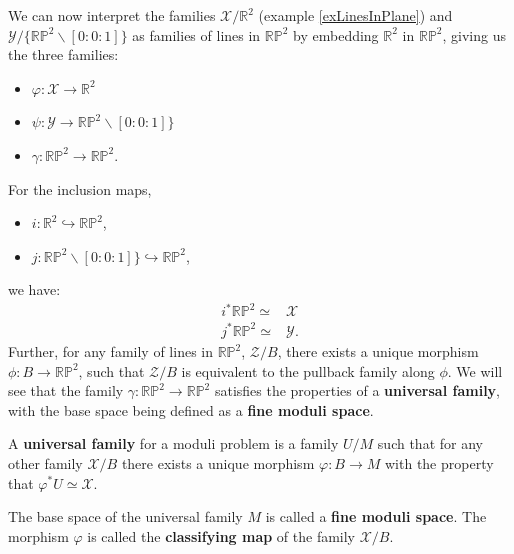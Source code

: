 \begin{example}
    \par We can now interpret the families $\mathcal{X}/\mathbb{R}^{2}$ (example \ref{exLinesInPlane}) and $\mathcal{Y}/\{\mathbb{RP}^{2}\backslash {[0:0:1]}\} $ as families of lines in $\mathbb{RP}^{2}$ by embedding $\mathbb{R}^{2}$ in $\mathbb{RP}^{2}$, giving us the three families:
    \begin{itemize}
        \item $\varphi : \mathcal{X} \to \mathbb{R}^{2}$
    \item $\psi: \mathcal{Y} \to \mathbb{RP}^{2}\backslash {[0:0:1]}\} $
    \item $\gamma: \mathbb{RP}^{2} \to \mathbb{RP}^{2}$.
\end{itemize}
For the inclusion maps, 
\begin{itemize}
    \item $i: \mathbb{R}^{2}\hookrightarrow \mathbb{RP}^{2}$,
\item $j: \mathbb{RP}^{2}\backslash {[0:0:1]}\} \hookrightarrow \mathbb{RP}^{2}$,
\end{itemize}
we have: 
\begin{align*}
    i^{*}\mathbb{RP}^{2} \simeq &\mathcal{X}\\
    j^{*}\mathbb{RP}^{2} \simeq &\mathcal{Y}.
\end{align*}
Further, for any family of lines in $\mathbb{RP}^{2}$, $\mathcal{Z}/B$, there exists a unique morphism $\phi :B \to \mathbb{RP}^{2}$, such that $\mathcal{Z}/B$ is equivalent to the pullback family along $\phi$.
We will see that the family $\gamma: \mathbb{RP}^{2} \to \mathbb{RP}^{2}$ satisfies the properties of a \textbf{universal family}, with the base space being defined as a \textbf{fine moduli space}.
\end{example}

\begin{definition}
    A \textbf{universal family} for a moduli problem is a family $U/M$ such that for any other family $\mathcal{X}/B$ there exists a unique morphism $\varphi: B \to M$ with the property that $\varphi^{*}U \simeq \mathcal{X}$.
    \par The base space of the universal family $M$ is called a \textbf{fine moduli space}. The morphism $\varphi$ is called the \textbf{classifying map} of the family $\mathcal{X}/B$.
\end{definition}

